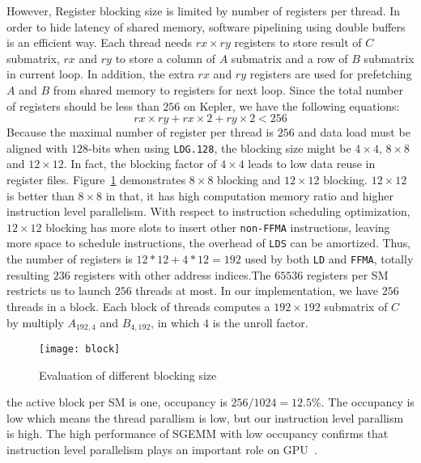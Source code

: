However, Register blocking size is limited by number of registers per thread. 
In order to hide latency of shared memory, software pipelining using double
buffers is an efficient way. Each thread needs $rx\times ry$ registers to store result of $C$ submatrix, $rx$ and $ry$ 
to store a column of $A$
submatrix and a row of $B$ submatrix in current loop. In addition, the extra $rx$ and $ry$ registers are used for 
prefetching $A$ and $B$ from shared memory to
registers for next loop. Since the total number of registers should be less than $256$ on Kepler, we have the following 
equations:
\begin{equation}
    rx\times ry + rx\times 2 + ry\times 2 < 256
\label{f_register}
\end{equation}
Because the maximal number of register per thread is $256$ and data load must be aligned with $128$-bits when using 
{\tt LDG.128}, the blocking size might be $4\times 4$, $8\times 8$ and $12\times 12$. In fact, the blocking factor of 
$4\times 4$ leads to low data reuse in register files. Figure~\ref{fig:block} demonstrates $8\times8$ blocking and 
$12\times12$ blocking. $12\times12$ is better than
$8\times8$ in that, it has high computation memory ratio and higher instruction level parallelism. With respect to 
instruction scheduling optimization, $12\times12$ blocking has more slots to insert other {\tt non-FFMA} instructions, 
leaving more
space to schedule instructions, the overhead of {\tt LDS} can be amortized. Thus, the number of registers is 
$12*12+4*12=192$ used by both {\tt LD} and {\tt FFMA}, totally resulting $236$ registers with other address indices.The 
$65536$ registers per SM restricts us to launch $256$ threads at most. In our implementation, we have $256$ threads in 
a block. Each block of threads computes a $192\times 192$ submatrix of $C$ by multiply $A_{192,4}$ and $B_{4, 192}$, in 
which $4$ is the unroll factor.

\begin{figure}[htbp]
\begin{center}
\texttt{[image: block]}
    \caption{Evaluation of different blocking size}
\label{fig:block}
\end{center}
\end{figure}
the active block per SM is one, occupancy is $256/1024=12.5\%$.
The occupancy is low which means the thread parallism is low, but our instruction level parallism is high. The high 
performance of SGEMM with low occupancy confirms that instruction level parallelism plays an important role on 
GPU~\cite{volkov2010better}.

